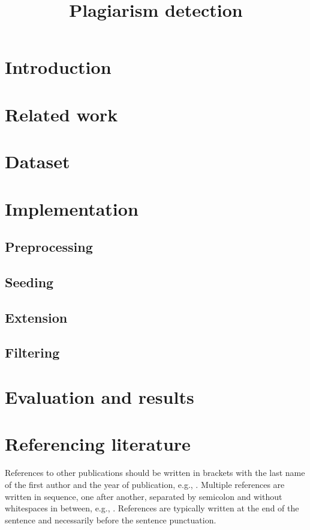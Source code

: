 \documentclass[10pt, a4paper]{article}
\title{Plagiarism detection}
\begin{document}
\maketitleabstract

\section{Introduction}

\section{Related work}

\section{Dataset}

\section{Implementation}

\subsection{Preprocessing}

\subsection{Seeding}

\subsection{Extension}

\subsection{Filtering}

\section{Evaluation and results}

\section{Referencing literature}


References to other publications should be written in brackets with the last name of the first author and the year of publication, e.g., \citep{chomsky-73}.  Multiple references are written in sequence, one after another, separated by semicolon and without whitespaces in between, e.g., \citep{chomsky-73,chave-64,feigl-58}. References are typically written at the end of the sentence and necessarily before the sentence punctuation.
\end{document}
